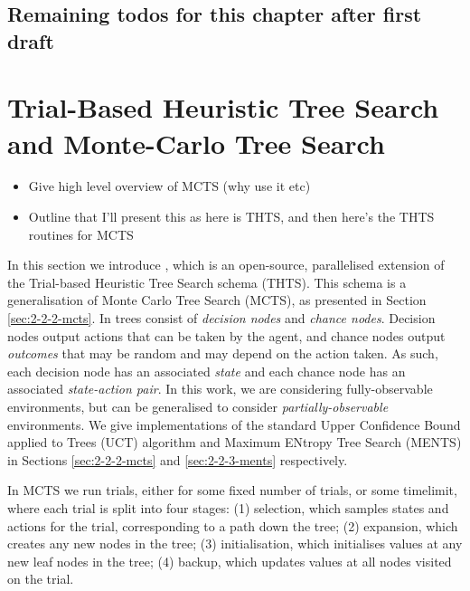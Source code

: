     \subsection{Remaining todos for this chapter after first draft}



\section{Trial-Based Heuristic Tree Search and Monte-Carlo Tree Search}
\label{sec:2-2-thts}

    \begin{itemize}
        \item Give high level overview of MCTS (why use it etc)
        \item Outline that I'll present this as here is THTS, and then here's the THTS routines for MCTS
    \end{itemize}



    In this section we introduce \thtspp\ewe \cite{thtspp}, which is an open-source, parallelised extension of the  Trial-based Heuristic Tree Search schema \cite{thts} (THTS). This schema is a generalisation of Monte Carlo Tree Search (MCTS), as presented in Section \ref{sec:2-2-2-mcts}. In \thtspp\ewe trees consist of \textit{decision nodes} and \textit{chance nodes}. Decision nodes output actions that can be taken by the agent, and chance nodes output \textit{outcomes} that may be random and may depend on the action taken. As such, each decision node has an associated \textit{state} and each chance node has an associated \textit{state-action pair}. In this work, we are considering fully-observable environments, but \thtspp\ewe can be generalised to consider \textit{partially-observable} environments. We give \thtspp\ewe implementations of the standard Upper Confidence Bound applied to Trees (UCT) algorithm and Maximum ENtropy Tree Search (MENTS) in Sections \ref{sec:2-2-2-mcts} and \ref{sec:2-2-3-ments} respectively.

    In MCTS we run trials, either for some fixed number of trials, or some timelimit, where each trial is split into four stages: 
        (1) selection, which samples states and actions for the trial, corresponding to a path down the tree;
        (2) expansion, which creates any new nodes in the tree; 
        (3) initialisation, which initialises values at any new leaf nodes in the tree;
        (4) backup, which updates values at all nodes visited on the trial.

